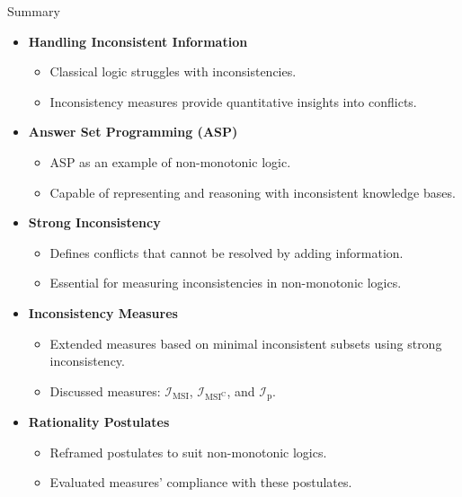 \begin{frame}{Summary}
    \begin{itemize}
        \item \textbf{Handling Inconsistent Information}
              \begin{itemize}
                  \item Classical logic struggles with inconsistencies.
                  \item Inconsistency measures provide quantitative insights into conflicts.
              \end{itemize}
        \item \textbf{Answer Set Programming (ASP)}
              \begin{itemize}
                  \item ASP as an example of non-monotonic logic.
                  \item Capable of representing and reasoning with inconsistent knowledge bases.
              \end{itemize}
        \item \textbf{Strong Inconsistency}
              \begin{itemize}
                  \item Defines conflicts that cannot be resolved by adding information.
                  \item Essential for measuring inconsistencies in non-monotonic logics.
              \end{itemize}
        \item \textbf{Inconsistency Measures}
              \begin{itemize}
                  \item Extended measures based on minimal inconsistent subsets using strong inconsistency.
                  \item Discussed measures: $\mathcal{I}_{\text{MSI}}$, $\mathcal{I}_{\text{MSI}^\text{C}}$, and $\mathcal{I}_{\text{p}}$.
              \end{itemize}
        \item \textbf{Rationality Postulates}
              \begin{itemize}
                  \item Reframed postulates to suit non-monotonic logics.
                  \item Evaluated measures' compliance with these postulates.
              \end{itemize}
    \end{itemize}
\end{frame}

